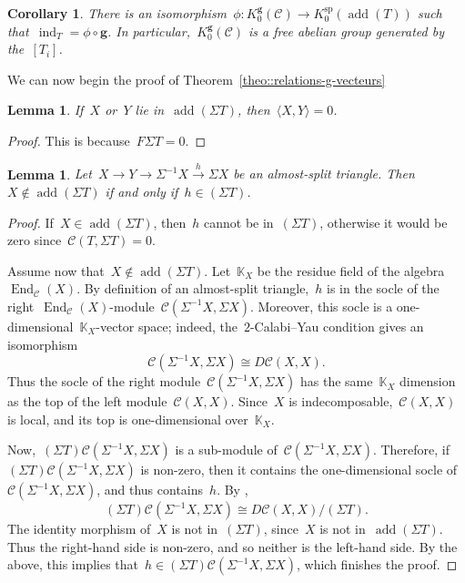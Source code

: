 \documentclass{amsart}
\newtheorem{corollary}[theorem]{Corollary}
\newtheorem{lemma}[theorem]{Lemma}
\theoremstyle{definition}
\renewcommand{\b}[1]{{\boldsymbol{#1}}} %
\newcommand{\field}{\mathbb{K}}
\newcommand{\cat}{\mathcal{C}}
\newcommand{\susp}{\Sigma}
\newcommand{\add}{\operatorname{add}}
\newcommand{\End}[1]{\operatorname{End}_{#1}}
\newcommand{\spl}{\operatorname{sp}}
\newcommand{\Ksp}{K_0^{\spl}}
\newcommand{\Kg}{K_0^{\b{g}}}
\newcommand{\ind}{\operatorname{ind}}
\begin{document}
\begin{corollary}
\label{coro::grothendieck-g-vectors}
 There is an isomorphism~$\phi:\Kg(\cat) \to \Ksp(\add(T))$ such that~$\ind_T = \phi\circ \b g$.  In particular,~$\Kg(\cat)$ is a free abelian group generated by the~$[T_i]$.
\end{corollary}

We can now begin the proof of Theorem~\ref{theo::relations-g-vecteurs}

\begin{lemma}
\label{lemm::bilinear-form-suspention-T}
 If~$X$ or~$Y$ lie in~$\add(\susp T)$, then~$\langle X, Y \rangle = 0$.
\end{lemma}
\begin{proof}
 This is because~$F\susp T = 0$.
\end{proof}

\begin{lemma}
\label{lemm::almost-split}
 Let~$X\xrightarrow{} Y \xrightarrow{} \susp^{-1} X \xrightarrow{h} \susp X$ be an almost-split triangle.  Then~$X\notin \add(\susp T)$ if and only if~$h\in (\susp T)$.
\end{lemma}
\begin{proof}
 If~$X\in \add(\susp T)$, then~$h$ cannot be in~$(\susp T)$, otherwise it would be zero since~$\cat(T, \susp T) =0$.  
 
 Assume now that~$X\notin \add(\susp T)$.  Let~$\field_X$ be the residue field of the algebra~$\End{\cat}(X)$. 
 By definition of an almost-split triangle,~$h$ is in the socle of the right~$\End{\cat}(X)$-module~$\cat(\susp^{-1} X, \susp X)$.  Moreover, this socle is a one-dimensional~$\field_X$-vector space; indeed, the~$2$-Calabi--Yau condition gives an isomorphism
 \[
  \cat(\susp^{-1} X, \susp X) \cong D\cat(X, X).
 \]
 Thus the socle of the right module~$\cat(\susp^{-1} X, \susp X)$ has the same~$\field_X$ dimension as the top of the left module~$\cat(X,X)$.  Since~$X$ is indecomposable,~$\cat(X,X)$ is local, and its top is one-dimensional over~$\field_X$.
 
 Now,~$(\susp T)\cat(\susp^{-1} X, \susp X)$ is a sub-module of~$\cat(\susp^{-1} X, \susp X)$.  Therefore, if~$(\susp T)\cat(\susp^{-1} X, \susp X)$ is non-zero, then it contains the one-dimensional socle of~$\cat(\susp^{-1} X, \susp X)$, and thus contains~$h$.   
 By \cite{Palu},
 \[
  (\susp T)\cat(\susp^{-1} X, \susp X) \cong D\cat(X, X)/(\susp T). 
 \]
The identity morphism of~$X$ is not in~$(\susp T)$, since~$X$ is not in~$\add(\susp T)$.  Thus the right-hand side is non-zero, and so neither is the left-hand side.  By the above, this implies that~$h\in (\susp T)\cat(\susp^{-1} X, \susp X)$, which finishes the proof.
\end{proof}
\end{document}
